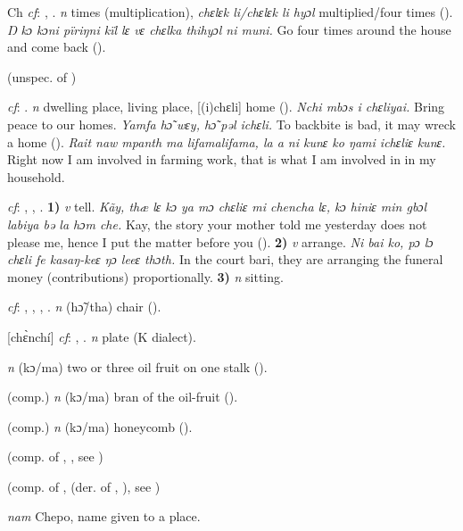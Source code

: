\begin{letter}{Ch}
 \textit{cf}: , . \textit{n} times (multiplication), \textit{chɛlɛk li/chɛlɛk li hyɔl } multiplied/four times (\citealt{Pichl1967}). \textit{Ŋ kɔ kɔni pïriŋni kïl lɛ vɛ chɛlka thihyɔl ni muni.} Go four times around the house and come back (\citealt{Pichl1967}). 

 (unspec. of ) 

 \textit{cf}: . \textit{n} dwelling place, living place, [(i)chɛli] home (\citealt{Pichl1967}). \textit{Nchi mbɔs i chɛliyai.} Bring peace to our homes. \textit{Yamfa hɔ̃ wɛy, hɔ̃ pəl ichɛli.} To backbite is bad, it may wreck a home (\citealt{Pichl1967}). \textit{Rait naw mpanth ma lifamalifama, la a ni kunɛ ko ŋami ichɛliɛ kunɛ.} Right now I am involved in farming work, that is what I am involved in in my household. 

 \textit{cf}: , , . \textbf{1)} \textit{v} tell. \textit{Kãy, thæ lɛ kɔ ya mɔ chɛliɛ mi chencha lɛ, kɔ hiniɛ min gbɔl labiya bə la hɔm che.} Kay, the story your mother told me yesterday does not please me, hence I put the matter before you (\citealt{Pichl1967}). \textbf{2)} \textit{v} arrange. \textit{Ni bai ko, pɔ lɔ chɛli fe kasaŋ-keɛ ŋɔ leeɛ thɔth.} In the court bari, they are arranging the funeral money (contributions) proportionally. \textbf{3)} \textit{n} sitting.

 \textit{cf}: , , , . \textit{n} (hɔ̃/tha) chair (\citealt{Pichl1967}). 

 [chɛ̀nchí] \textit{cf}: , . \textit{n} plate (K dialect). 

 \textit{n} (kɔ/ma) two or three oil fruit on one stalk (\citealt{Pichl1967}). 

 (comp.) \textit{n} (kɔ/ma) bran of the oil-fruit (\citealt{Pichl1967}). 

 (comp.) \textit{n} (kɔ/ma) honeycomb (\citealt{Pichl1967}).

 (comp. of , , see ) 

 (comp. of ,  (der. of , ), see ) 

 \textit{nam} Chepo, name given to a place.


\end{letter}
